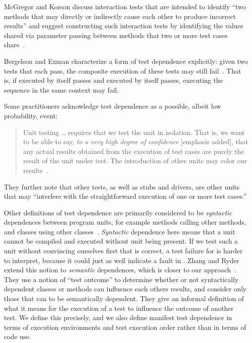 McGregor and Korson discuss interaction tests that
are intended to identify ``two methods that may directly or indirectly
cause each other to produce incorrect results'' and suggest constructing such
interaction tests by identifying the values shared via parameter passing
between methods
 that two or more test cases share~\cite[p~.69]{mcgregoretal:CACM:1994}.

Bergelson and Exman characterize a form of test dependence
explicitly: given two tests that each pass, the composite
execution of these tests may still
fail~\cite[p.~38]{bergelsonetal:EEE:2006}.  That is, if 
 executed by itself passes and  executed by itself passes,
executing the sequence  in the same context may fail.

Some practitioners acknowledge test dependence as a possible, albeit low probability, event:
\begin{quote}
Unit testing \dots  
requires that we test the unit in isolation. That is, we
want to be able to say, \emph{to a very high degree of confidence\/} [emphasis added], that
any actual results obtained from the execution of test cases are
purely the result of the unit under test. The introduction of
other units may color our results~\cite{unit-test-def}.
\end{quote}
They further note that other tests, as well as stubs and drivers, are
other units that may ``interfere with the straightforward
execution of one or more test cases.''

Other definitions of test dependence are primarily considered
to be \textit{syntactic} dependences between program units, for example
methods calling other methods, and classes using other classes~\cite{bergelsonetal:EEE:2006,briandetal:SEKE:2002}. 
\emph{Syntactic} dependence here means that a unit  cannot be
compiled and executed without unit  being present. If we test
such a unit  without convincing ourselves first that 
is correct, a test failure for  is harder to interpret,
because it could just as well indicate a fault in .
Zhang and Ryder extend this notion to \emph{semantic} dependences,
which is closer to our approach~\cite{zhangetal:TR:2006}. 
They use a notion of
``test outcome'' to determine whether or not syntactically dependent
classes or methods can influence each others results, and consider
only those that can to be semantically dependent.
They give an informal definition of what it means for the execution of a
test to influence the outcome of another test.  We define
this precisely, and we also define manifest test dependence in terms
of execution environments
and test execution order rather than in terms of code use.

